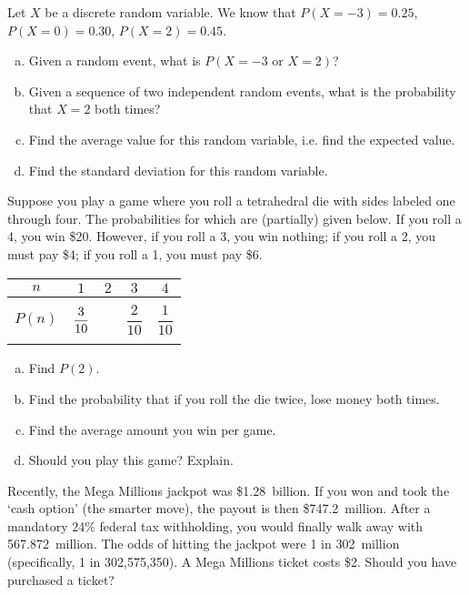 \documentclass[11pt,letterpaper]{article}
\begin{document}

 Let $X$ be a discrete random variable. We know that $P(X= -3)= 0.25$, $P(X= 0)= 0.30$, $P(X= 2)= 0.45$. 
	\begin{enumerate}[(a)]
	\item Given a random event, what is $P(X= -3 \text{ or } X= 2)$?
	\item Given a sequence of two independent random events, what is the probability that $X= 2$ both times?
	\item Find the average value for this random variable, i.e. find the expected value.
	\item Find the standard deviation for this random variable. 
	\end{enumerate}



\newpage



 Suppose you play a game where you roll a tetrahedral die with sides labeled one through four. The probabilities for which are (partially) given below. If you roll a 4, you win \$20. However, if you roll a 3, you win nothing; if you roll a 2, you must pay \$4; if you roll a 1, you must pay \$6. 
	\begin{table}[!ht]
	\centering 
	\begin{tabular}{|c||c|c|c|c|} \hline 
	$n$ & $1$ & $2$ & $3$ & $4$ \\ \hline 
	$P(n)$ & $\dfrac{3\rule{0pt}{2.9ex}}{10\rule[-1.3ex]{0pt}{0pt}}$ & \phantom{$\dfrac{00}{00}$} & $\dfrac{2}{10}$ & $\dfrac{1}{10}$ \\ \hline 
	\end{tabular}
	\end{table}

\begin{enumerate}[(a)]
\item Find $P(2)$. 
\item Find the probability that if you roll the die twice, lose money both times. 
\item Find the average amount you win per game. 
\item Should you play this game? Explain.
\end{enumerate}



\newpage



 Recently, the Mega Millions jackpot was \$1.28~billion. If you won and took the `cash option' (the smarter move), the payout is then \$747.2~million. After a mandatory 24\% federal tax withholding, you would finally walk away with 567.872~million. The odds of hitting the jackpot were 1 in 302~million (specifically, 1 in 302,575,350). A Mega Millions ticket costs \$2. Should you have purchased a ticket?
\end{document}
